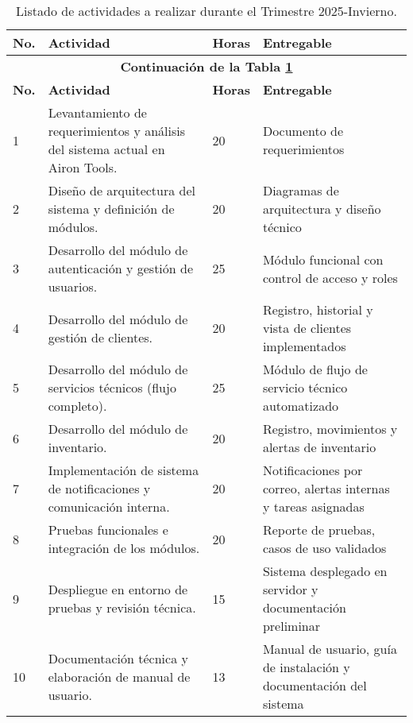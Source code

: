 \begin{longtable}{p{} p{} p{} p{}}
	\caption{Listado de actividades a realizar durante el Trimestre 2025-Invierno.}
  	\label{table:calendarioActividades}\\
	\toprule
	\textbf{No.} & \textbf{Actividad} & \textbf{Horas} & \textbf{Entregable} \\
	\hline
	\endfirsthead

	\multicolumn{4}{c}{\textbf{Continuación de la Tabla \ref{table:calendarioActividades}}}\\
	\hline
	\textbf{No.} & \textbf{Actividad} & \textbf{Horas} & \textbf{Entregable} \\
	\hline
	\endhead

	\hline
	\endlastfoot

	1 & Levantamiento de requerimientos y análisis del sistema actual en Airon Tools. & 20 & Documento de requerimientos \\
	\midrule

	2 & Diseño de arquitectura del sistema y definición de módulos. & 20 & Diagramas de arquitectura y diseño técnico \\
	\midrule

	3 & Desarrollo del módulo de autenticación y gestión de usuarios. & 25 & Módulo funcional con control de acceso y roles \\
	\midrule

	4 & Desarrollo del módulo de gestión de clientes. & 20 & Registro, historial y vista de clientes implementados \\
	\midrule

	5 & Desarrollo del módulo de servicios técnicos (flujo completo). & 25 & Módulo de flujo de servicio técnico automatizado \\
	\midrule

	6 & Desarrollo del módulo de inventario. & 20 & Registro, movimientos y alertas de inventario \\
	\midrule

	7 & Implementación de sistema de notificaciones y comunicación interna. & 20 & Notificaciones por correo, alertas internas y tareas asignadas \\
	\midrule

	8 & Pruebas funcionales e integración de los módulos. & 20 & Reporte de pruebas, casos de uso validados \\
	\midrule

	9 & Despliegue en entorno de pruebas y revisión técnica. & 15 & Sistema desplegado en servidor y documentación preliminar \\
	\midrule

	10 & Documentación técnica y elaboración de manual de usuario. & 13 & Manual de usuario, guía de instalación y documentación del sistema \\
	\bottomrule
\end{longtable}

